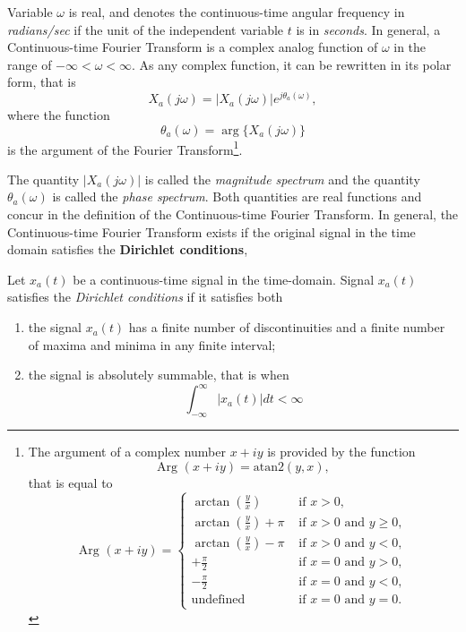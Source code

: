 \documentclass[\documentfontsize, twocolumn]{\classname}
\begin{document}
Variable $\omega$ is real, and denotes the continuous-time angular frequency in \emph{radians/sec} if the unit of the independent variable $t$ is in \emph{seconds}. In general, a Continuous-time Fourier Transform is a complex analog function of $\omega$ in the range of $-\infty < \omega < \infty$. As any complex function, it can be rewritten in its polar form, that is
\begin{equation}\label{eqn:continuousTimeFourierTransformPolar}
    X_a(j\omega) = \left|X_a(j\omega)\right|e^{j\theta_a(\omega)},
\end{equation}
where the function
\begin{equation}\label{eqn:continuousTimeFourierTransformPolarTheta}
    \theta_a(\omega)=\arg\{X_a(j\omega)\}
\end{equation}
is the argument of the Fourier Transform\footnote{
    The argument of a complex number $x+iy$ is provided by the function \[\mbox{Arg }(x+iy) = \mbox{atan2} (y, x),\] that is equal to
    \[
        \mbox{Arg }(x+iy) = \left\{\begin{array}{ll}
                \arctan{(\frac y x)} & \mbox { if } x>0,\\
                \arctan{(\frac y x)} + \pi & \mbox { if } x>0 \mbox { and } y \geq 0,\\
                \arctan{(\frac y x)} - \pi & \mbox { if } x>0 \mbox { and } y < 0,\\
                +\frac \pi 2  & \mbox { if } x=0 \mbox { and } y>0,\\
                -\frac \pi 2  & \mbox { if } x=0 \mbox { and } y<0,\\
                \mathrm{ undefined } & \mbox{ if } x=0 \mbox { and } y = 0.
            \end{array}\right.
    \]
}.

The quantity $|X_a(j\omega)|$ is called the \emph{magnitude spectrum} and the quantity $\theta_a(\omega)$ is called the \emph{phase spectrum}. Both quantities are real functions and concur in the definition of the Continuous-time Fourier Transform. In general, the Continuous-time Fourier Transform exists if the original signal in the time domain satisfies the \textbf{Dirichlet conditions},
\begin{rules}
    Let $x_a(t)$ be a continuous-time signal in the time-domain. Signal $x_a(t)$ satisfies the \emph{Dirichlet conditions} if it satisfies both
    \begin{enumerate}
        \item the signal $x_a(t)$ has a finite number of discontinuities and a finite number of maxima and minima in any finite interval;
        \item the signal is absolutely summable, that is when
            \[
                \int_{-\infty}^\infty |x_a(t)|dt < \infty
            \]
    \end{enumerate}
\end{rules}
\end{document}
